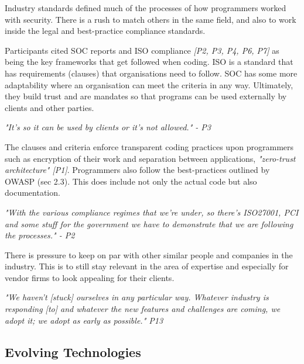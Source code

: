 \par Industry standards defined much of the processes of how programmers worked with security. There is a rush to match others in the same field, and also to work inside the legal and best-practice compliance standards. 
\newline
\par 
Participants cited SOC reports and ISO \cite{iso} compliance \textit{[P2, P3, P4, P6, P7]} as being the key frameworks that get followed when coding. ISO is a standard that has requirements (clauses) that organisations need to follow. SOC has some more adaptability where an organisation can meet the criteria in any way. Ultimately, they build trust and are mandates so that programs can be used externally by clients and other parties. 
\newline
\par
\textit{"It's so it can be used by clients or it's not allowed." - P3}
\newline
\par
The clauses and criteria enforce transparent coding practices upon programmers such as encryption of their work and separation between applications, \textit{"zero-trust architecture" [P1]}. Programmers also follow the best-practices outlined by OWASP (sec 2.3). This does include not only the actual code but also documentation. 
\newline
\par
\textit{"With the various compliance regimes that we're under, so there's ISO27001, PCI and some stuff for the government we have to demonstrate that we are following the processes." - P2}
\newline
\par
There is pressure to keep on par with other similar people and companies in the industry. This is to still stay relevant in the area of expertise and especially for vendor firms to look appealing for their clients. 
\newline
\par
\textit{"We haven't [stuck] ourselves in any particular way. Whatever industry is responding [to] and whatever the new features and challenges are coming, we adopt it; we adopt as early as possible." P13}

\subsection{Evolving Technologies}

